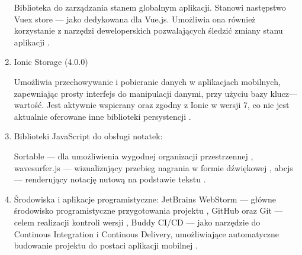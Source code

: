 \begin{enumerate}
	      Biblioteka do zarządzania stanem globalnym aplikacji. Stanowi następstwo Vuex store — jako dedykowana dla
	      Vue.js. Umożliwia ona również korzystanie z narzędzi deweloperskich pozwalających śledzić zmiany stanu aplikacji \cite{pinia}.
	\item Ionic Storage (4.0.0)

	      Umożliwia przechowywanie i pobieranie danych
	      w aplikacjach mobilnych, zapewniając prosty interfejs do manipulacji danymi, przy użyciu bazy klucz—wartość.
	      Jest aktywnie wspierany oraz zgodny z Ionic w wersji 7, co nie jest aktualnie oferowane inne biblioteki persystencji \cite{storage}.
	\item Biblioteki JavaScript do obsługi notatek:

	      Sortable — dla umożliwienia wygodnej organizacji przestrzennej \cite{sortablejs},
	      wavesurfer.js — wizualizujący przebieg nagrania w formie dźwiękowej \cite{wavesurfer},
	      abcjs — renderujący notację nutową na podstawie tekstu \cite{abcjs}.

	\item Środowiska i aplikacje programistyczne:
	      JetBrains WebStorm — główne środowisko programistyczne przygotowania projektu \cite{webstorm},
	      GitHub oraz Git — celem realizacji kontroli wersji \cite{github}\cite{git},
	      Buddy CI/CD — jako narzędzie do Continous Integration i Continous Delivery, umożliwiające automatyczne budowanie projektu do
	      postaci aplikacji mobilnej \cite{buddy}.
\end{enumerate}